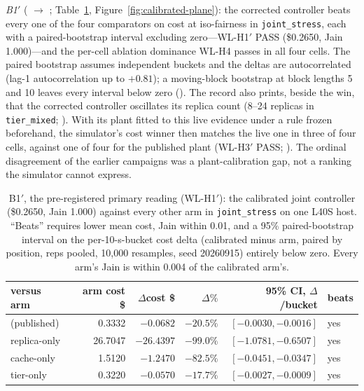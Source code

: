 \emph{B1$'$} ( $\to$
; Table~\ref{tab:b1prime},
Figure~\ref{fig:calibrated-plane}): the corrected controller beats every one
of the four comparators on cost at iso-fairness in \texttt{joint\_stress},
each with a paired-bootstrap interval excluding zero---WL-H1$'$ PASS
(\$0.2650, Jain 1.000)---and the per-cell ablation dominance WL-H4 passes
in all four cells. The paired bootstrap assumes independent buckets and the
deltas are autocorrelated (lag-1 autocorrelation up to $+0.81$); a
moving-block bootstrap at block lengths 5 and 10 leaves every interval
below zero (). The record also
prints, beside the win, that the corrected controller oscillates its
replica count (8--24 replicas in \texttt{tier\_mixed};
). With its plant fitted to this live
evidence under a rule frozen beforehand, the simulator's cost winner then
matches the live one in three of four cells, against one of four for the
published plant (WL-H3$'$ PASS; ).
The ordinal disagreement of the earlier campaigns was a plant-calibration
gap, not a ranking the simulator cannot express.

\begin{table}[htbp]
\centering\tablefontsmall\setlength{\tabcolsep}{4pt}
\begin{tabular}{@{}lrrrrl@{}}
\toprule
\textbf{versus arm} & \textbf{arm cost \$} & $\Delta$\textbf{cost \$} & $\Delta\%$ & \textbf{95\% CI, $\Delta$/bucket} & \textbf{beats} \\
\midrule
\polyforge{} (published) & 0.3332  & $-0.0682$  & $-20.5\%$ & $[-0.0030, -0.0016]$ & yes \\
replica-only             & 26.7047 & $-26.4397$ & $-99.0\%$ & $[-1.0781, -0.6507]$ & yes \\
cache-only               & 1.5120  & $-1.2470$  & $-82.5\%$ & $[-0.0451, -0.0347]$ & yes \\
tier-only                & 0.3220  & $-0.0570$  & $-17.7\%$ & $[-0.0027, -0.0009]$ & yes \\
\bottomrule
\end{tabular}
\caption{B1$'$, the pre-registered primary reading (WL-H1$'$): the
calibrated joint controller (\$0.2650, Jain 1.000) against every other arm
in \texttt{joint\_stress} on one L40S host. ``Beats'' requires lower mean
cost, Jain within 0.01, and a 95\% paired-bootstrap interval on the
per-10-s-bucket cost delta (calibrated minus arm, paired by position, reps
pooled, 10,000 resamples, seed 20260915) entirely below zero. Every arm's
Jain is within 0.004 of the calibrated arm's.}
\label{tab:b1prime}
\end{table}

